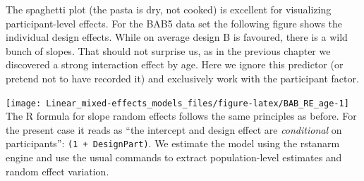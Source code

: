 \documentclass[]{svmono}
\newenvironment{Shaded}{\begin{snugshade}}{\end{snugshade}}
\newcommand{\KeywordTok}[1]{\textcolor[rgb]{0.13,0.29,0.53}{\textbf{#1}}}
\newcommand{\DataTypeTok}[1]{\textcolor[rgb]{0.13,0.29,0.53}{#1}}
\newcommand{\DecValTok}[1]{\textcolor[rgb]{0.00,0.00,0.81}{#1}}
\newcommand{\StringTok}[1]{\textcolor[rgb]{0.31,0.60,0.02}{#1}}
\newcommand{\OtherTok}[1]{\textcolor[rgb]{0.56,0.35,0.01}{#1}}
\newcommand{\OperatorTok}[1]{\textcolor[rgb]{0.81,0.36,0.00}{\textbf{#1}}}
\newcommand{\NormalTok}[1]{#1}
\begin{document}
The spaghetti plot (the pasta is dry, not cooked) is excellent for
visualizing participant-level effects. For the BAB5 data set the
following figure shows the individual design effects. While on average
design B is favoured, there is a wild bunch of slopes. That should not
surprise us, as in the previous chapter we discovered a strong
interaction effect by age. Here we ignore this predictor (or pretend not
to have recorded it) and exclusively work with the participant factor.

\begin{Shaded}
\end{Shaded}

\texttt{[image: Linear\_mixed-effects\_models\_files/figure-latex/BAB\_RE\_age-1]}
The R formula for slope random effects follows the same principles as
before. For the present case it reads as ``the intercept and design
effect are \emph{conditional} on participants'':
\texttt{(1\ +\ Design\textbar{}Part)}. We estimate the model using the
rstanarm engine and use the usual commands to extract population-level
estimates and random effect variation.
\end{document}
